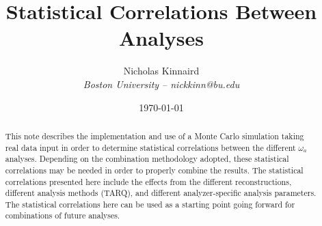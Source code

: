 \documentclass[12pt,letterpaper]{article}
\title{Statistical Correlations Between \Rone \wa Analyses}
\author{Nicholas Kinnaird \\ \small{\textit{Boston University -- nickkinn@bu.edu}}}
\date{\today}
\begin{document}
\maketitle

\begin{abstract}
	This note describes the implementation and use of a Monte Carlo simulation taking real data input in order to determine statistical correlations between the different \Rone $\omega_{a}$ analyses. Depending on the combination methodology adopted, these statistical correlations may be needed in order to properly combine the results. The statistical correlations presented here include the effects from the different reconstructions, different analysis methods (TARQ), and different analyzer-specific analysis parameters. The statistical correlations here can be used as a starting point going forward for combinations of future \wa analyses.
\end{abstract}

\tableofcontents







% 


\printbibliography

\end{document}
